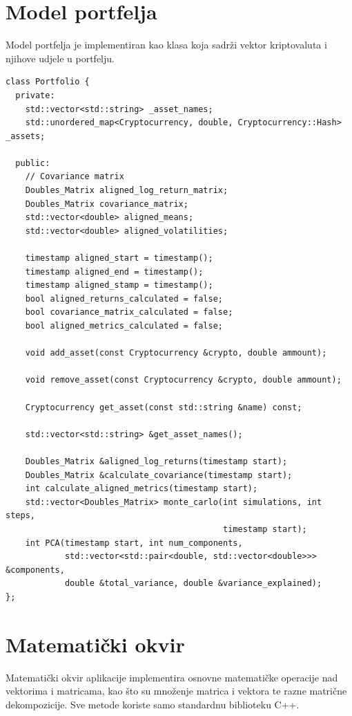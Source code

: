 \documentclass[zavrsnirad]{fer}
\begin{document}
\section{Model portfelja}
\label{sek:model_portfelja}
Model portfelja je implementiran kao klasa koja
sadrži vektor kriptovaluta i njihove udjele u portfelju.
\begin{lstlisting}
class Portfolio {
  private:
    std::vector<std::string> _asset_names;
    std::unordered_map<Cryptocurrency, double, Cryptocurrency::Hash> _assets;

  public:
    // Covariance matrix
    Doubles_Matrix aligned_log_return_matrix;
    Doubles_Matrix covariance_matrix;
    std::vector<double> aligned_means;
    std::vector<double> aligned_volatilities;

    timestamp aligned_start = timestamp();
    timestamp aligned_end = timestamp();
    timestamp aligned_stamp = timestamp();
    bool aligned_returns_calculated = false;
    bool covariance_matrix_calculated = false;
    bool aligned_metrics_calculated = false;

    void add_asset(const Cryptocurrency &crypto, double ammount);

    void remove_asset(const Cryptocurrency &crypto, double ammount);

    Cryptocurrency get_asset(const std::string &name) const;

    std::vector<std::string> &get_asset_names();

    Doubles_Matrix &aligned_log_returns(timestamp start);
    Doubles_Matrix &calculate_covariance(timestamp start);
    int calculate_aligned_metrics(timestamp start);
    std::vector<Doubles_Matrix> monte_carlo(int simulations, int steps,
                                            timestamp start);
    int PCA(timestamp start, int num_components,
            std::vector<std::pair<double, std::vector<double>>> &components,
            double &total_variance, double &variance_explained);
};
\end{lstlisting}

\section{Matematički okvir}
\label{sek:matematicki_okvir}
Matematički okvir aplikacije implementira osnovne matematičke
operacije nad vektorima i matricama, kao što su množenje
matrica i vektora te razne matrične dekompozicije. Sve metode koriste
samo standardnu biblioteku C++.
\end{document}
